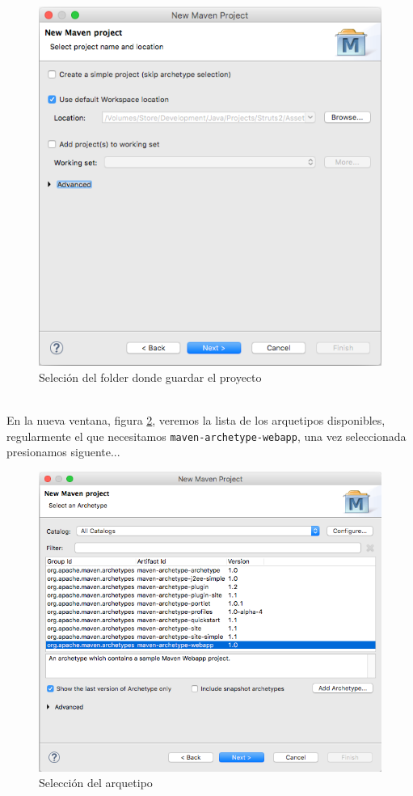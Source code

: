 \documentclass[12pt]{article}
\begin{document}
        \begin{figure}[h]
            \centering
            \includegraphics[scale=0.4]{02_nuevo_proyecto}
            \caption{Seleci\'on del folder donde guardar el proyecto}
            \label{02_nuevo_proyecto}
        \end{figure}
        \\
        En la nueva ventana, figura \ref{03_nuevo_proyecto}, veremos la lista de los arquetipos disponibles, regularmente el que necesitamos \texttt{maven-archetype-webapp}, una vez seleccionada presionamos siguente...
         \begin{figure}[h]
            \centering
            \includegraphics[scale=0.4]{03_nuevo_proyecto}
            \caption{Selecci\'on del arquetipo}
            \label{03_nuevo_proyecto}
        \end{figure}
\end{document}
